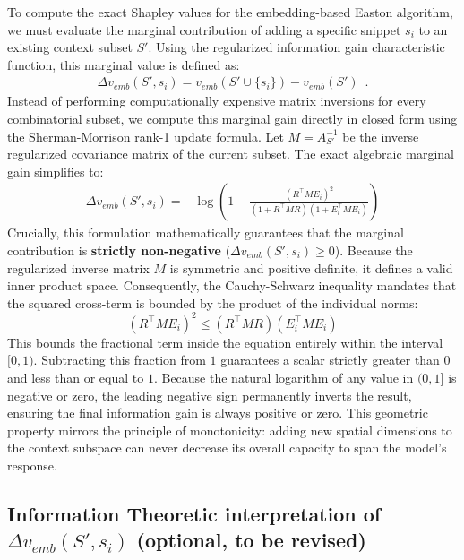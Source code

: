 \documentclass{article}
\begin{document}
To compute the exact Shapley values for the embedding-based Easton algorithm, we must evaluate the marginal contribution of adding a specific snippet $s_i$ to an existing context subset $S'$. Using the regularized information gain characteristic function, this marginal value is defined as:
\begin{align}\label{eq:v_emp}
 \Delta v_{emb}(S', s_i) = v_{emb}(S' \cup \{s_i\}) - v_{emb}(S') \enspace .
\end{align}
Instead of performing computationally expensive matrix inversions for every combinatorial subset, we compute this marginal gain directly in closed form using the Sherman-Morrison rank-1 update formula. Let $M = A_{S'}^{-1}$ be the inverse regularized covariance matrix of the current subset. The exact algebraic marginal gain simplifies to:
\begin{align}  \label{eq:marginal_gain}
  \Delta v_{emb}(S', s_i) = - \log \left( 1 - \frac{(R^\top M E_i)^2}{(1 + R^\top M R)(1 + E_i^\top M E_i)} \right)
\end{align}
Crucially, this formulation mathematically guarantees that the marginal contribution is \textbf{strictly non-negative} ($\Delta v_{emb}(S', s_i) \ge 0$). Because the regularized inverse matrix $M$ is symmetric and positive definite, it defines a valid inner product space. Consequently, the Cauchy-Schwarz inequality mandates that the squared cross-term is bounded by the product of the individual norms:
$$ (R^\top M E_i)^2 \le (R^\top M R)(E_i^\top M E_i) $$
This bounds the fractional term inside the equation entirely within the interval $[0, 1)$. Subtracting this fraction from $1$ guarantees a scalar strictly greater than $0$ and less than or equal to $1$. Because the natural logarithm of any value in $(0, 1]$ is negative or zero, the leading negative sign permanently inverts the result, ensuring the final information gain is always positive or zero. This geometric property mirrors the principle of monotonicity: adding new spatial dimensions to the context subspace can never decrease its overall capacity to span the model's response.

\subsection{Information Theoretic interpretation of $\Delta v_{emb}(S', s_i)$ (optional, to be revised)}
\end{document}
